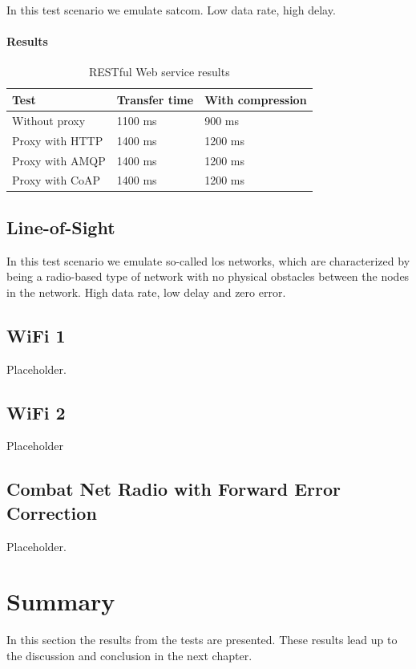 In this test scenario we emulate \gls{satcom}. Low data rate, high delay.

\paragraph{Results}

\begin{table}[h!]
\begin{tabular}{| l | l | l |}
\hline
  \textbf{Test} & \textbf{Transfer time} & \textbf{With compression}\\ \hline
  Without proxy & 1100 ms & 900 ms \\ \hline
  Proxy with HTTP & 1400 ms & 1200 ms \\ \hline
  Proxy with AMQP & 1400 ms & 1200 ms \\ \hline
  Proxy with CoAP & 1400 ms & 1200 ms \\ \hline
\end{tabular}
\caption{RESTful Web service results}
\end{table}

\subsection{Line-of-Sight}

In this test scenario we emulate so-called \gls{los} networks, which are
characterized by being a radio-based type of network with no physical obstacles
between the nodes in the network. High data rate, low delay and zero error.

\subsection{WiFi 1}

Placeholder.


\subsection{WiFi 2}

Placeholder

\subsection{Combat Net Radio with Forward Error Correction}

Placeholder.

\section{Summary}

In this section the results from the tests are presented. These results lead up
to the discussion and conclusion in the next chapter.
